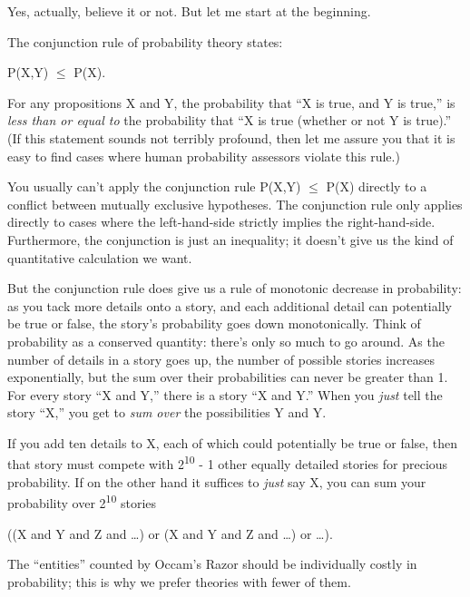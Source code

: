 {
 Yes, actually, believe it or not. But let me start at the
beginning.}

{
 The conjunction rule of probability theory states:}

{\centering
 P(X,Y) ${\leq}$ P(X).
\par}


\bigskip

{
 For any propositions X and Y, the probability that
``X is true, and Y is true,'' is
\textit{less than or equal to} the probability that
``X is true (whether or not Y is
true).'' (If this statement sounds not terribly
profound, then let me assure you that it is easy to find cases where
human probability assessors violate this rule.) }

{
 You usually can't apply the conjunction rule
P(X,Y) ${\leq}$ P(X) directly to a conflict between mutually exclusive
hypotheses. The conjunction rule only applies directly to cases where
the left-hand-side strictly implies the right-hand-side. Furthermore,
the conjunction is just an inequality; it doesn't give
us the kind of quantitative calculation we want.}

{
 But the conjunction rule does give us a rule of monotonic decrease
in probability: as you tack more details onto a story, and each
additional detail can potentially be true or false, the
story's probability goes down monotonically. Think of
probability as a conserved quantity: there's only so
much to go around. As the number of details in a story goes up, the
number of possible stories increases exponentially, but the sum over
their probabilities can never be greater than 1. For every story
``X and Y,'' there is a story
``X and {\textlnot}Y.'' When you
\textit{just} tell the story ``X,''
you get to \textit{sum over} the possibilities Y and {\textlnot}Y.}

{
 If you add ten details to X, each of which could potentially be
true or false, then that story must compete with 2\textsuperscript{10}
- 1 other equally detailed stories for precious probability. If on the
other hand it suffices to \textit{just} say X, you can sum your
probability over 2\textsuperscript{10} stories}

{\centering
 ((X and Y and Z and \ldots) or (X and {\textlnot}Y and Z and \ldots)
or \ldots).
\par}


\bigskip

{
 The ``entities'' counted by
Occam's Razor should be individually costly in
probability; this is why we prefer theories with fewer of them. }

